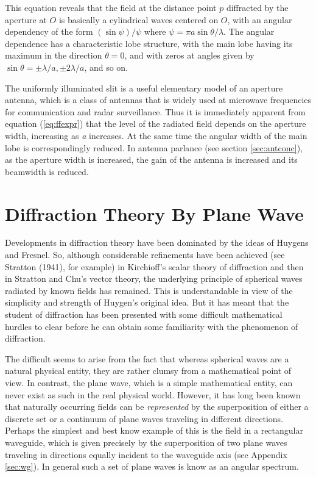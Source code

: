 This equation reveals that the field at the distance point $p$ diffracted by the aperture at $O$ is basically a cylindrical waves centered on $O$, with an angular dependency of the form $(\sin \psi)/\psi$ where $\psi = \pi a\sin \theta/\lambda$. The angular dependence has a characteristic lobe structure, with the main lobe having its maximum in the direction $\theta=0$, and with zeros at angles given by $\sin \theta = \pm \lambda/a, \pm2\lambda/a$, and so on.

The uniformly illuminated slit is a useful elementary model of an aperture antenna, which is a class of antennas that is widely used at microwave frequencies for communication and radar surveillance. Thus it is immediately apparent from equation (\ref{eq:ffexpr}) that the level of the radiated field depends on the aperture width, increasing as {\itshape a} increases. At the same time the angular width of the main lobe is correspondingly reduced. In antenna parlance (see section \ref{sec:antconc}), as the aperture width is increased, the gain of the antenna is increased and its beamwidth is reduced.

\section{Diffraction Theory By Plane Wave}
Developments in diffraction theory have been dominated by the ideas of Huygens and Fresnel. So, although considerable refinements have been achieved (see Stratton (1941), for example) in Kirchioff's scalar theory of diffraction and then in Stratton and Chu's vector theory, the underlying principle of spherical waves radiated by known fields has remained. This is understandable in view of the simplicity and strength of Huygen's original idea. But it has meant that the student of diffraction has been presented with some difficult mathematical hurdles to clear before he can obtain some familiarity with the phenomenon of diffraction.

The difficult seems to arise from the fact that whereas spherical waves are a natural physical entity, they are rather clumsy from a mathematical point of view. In contrast, the plane wave, which is a simple mathematical entity, can never exist as such in the real physical world. However, it has long been known that naturally occurring fields can be {\itshape represented} by the superposition of either a discrete set or a continuum of plane waves traveling in different directions. Perhaps the simplest and best know example of this is the field in a rectangular waveguide, which is given precisely by the superposition of two plane waves traveling in directions equally incident to the waveguide axis (see Appendix \ref{sec:wg}). In general such a set of plane waves is know as an angular spectrum.


